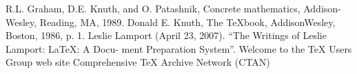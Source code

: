
\begin{thebibliography}{9}
\bibitem{} R.L. Graham, D.E. Knuth, and O. Patashnik, Concrete mathematics, Addison-Wesley, Reading, MA, 1989.
\bibitem{} Donald E. Knuth, The TeXbook, AddisonWesley, Boston, 1986, p. 1.
\bibitem{} Leslie Lamport (April 23, 2007). “The Writings of Leslie Lamport: LaTeX: A Docu-
ment Preparation System”.
\bibitem{} Welcome to the TeX Users Group web site
\bibitem{} Comprehensive TeX Archive Network (CTAN)
\end{thebibliography}

